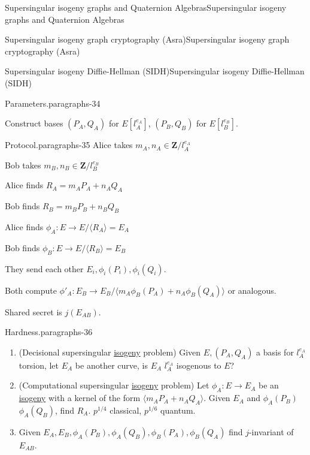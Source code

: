 \documentclass[10pt,]{book}
\numberwithin{equation}{section}
\newcommand{\lb}{[}
\newcommand{\rb}{]}
\newcommand{\ZZ}{\mathbf{Z}}
\begin{document}
\begin{chapterptx}{Supersingular isogeny graphs and Quaternion Algebras}{}{Supersingular isogeny graphs and Quaternion Algebras}{}{}
\begin{sectionptx}{Supersingular isogeny graph cryptography (Asra)}{}{Supersingular isogeny graph cryptography (Asra)}{}{}
\begin{subsectionptx}{Supersingular isogeny Diffie-Hellman (SIDH)}{}{Supersingular isogeny Diffie-Hellman (SIDH)}{}{}
\begin{paragraphs}{Parameters.}{paragraphs-34}
\par
\hypertarget{p-842}{}%
Construct bases \((P_A, Q_A)\) for \(E\lb l_A^{e_A}\rb\), \((P_B, Q_B)\) for \(E\lb l_B^{e_B}\rb\).%
\end{paragraphs}%
\begin{paragraphs}{Protocol.}{paragraphs-35}%
\hypertarget{p-843}{}%
Alice takes \(m_A,n_A \in \ZZ/l_A^{e_A}\)%
\par
\hypertarget{p-844}{}%
Bob takes \(m_B,n_B \in \ZZ/l_B^{e_B}\)%
\par
\hypertarget{p-845}{}%
Alice finds \(R_A = m_AP_A + n_AQ_A\)%
\par
\hypertarget{p-846}{}%
Bob finds \(R_B = m_BP_B + n_BQ_B\)%
\par
\hypertarget{p-847}{}%
Alice finds \(\phi_A \colon E \to E/\langle R_A\rangle = E_A\)%
\par
\hypertarget{p-848}{}%
Bob finds \(\phi_B \colon E \to E/\langle R_B\rangle = E_B\)%
\par
\hypertarget{p-849}{}%
They send each other \(E_i, \phi_i(P_i),\phi_i(Q_i)\).%
\par
\hypertarget{p-850}{}%
Both compute \(\phi'_A\colon E_B \to E_B/\langle m_A\phi_B(P_A) + n_A\phi_B(Q_A)\rangle\) or analogous.%
\par
\hypertarget{p-851}{}%
Shared secret is \(j(E_{AB})\).%
\end{paragraphs}%
\begin{paragraphs}{Hardness.}{paragraphs-36}%
\hypertarget{p-852}{}%
\leavevmode%
\begin{enumerate}
\item\hypertarget{li-212}{}(Decisional supersingular \hyperref[def-supersing-isog-isog]{isogeny} problem) Given \(E, (P_A,Q_A)\) a basis for \(l_A^{e_A}\) torsion, let \(E_A\) be another curve, is \(E_A\) \(l_A^{e_A}\) isogenous to \(E\)?%
\item\hypertarget{li-213}{}(Computational supersingular \hyperref[def-supersing-isog-isog]{isogeny} problem) Let \(\phi_A \colon E \to E_A\) be an \hyperref[def-supersing-isog-isog]{isogeny} with a kernel of the form \(\langle m_AP_A + n_AQ_A \rangle\). Given \(E_A\) and \(\phi_A(P_B)\) \(\phi_A(Q_B)\), find \(R_A\). \(p^{1/4}\) classical, \(p^{1/6}\) quantum.%
\item\hypertarget{li-214}{}Given \(E_A, E_B, \phi_A(P_B), \phi_A(Q_B), \phi_B(P_A), \phi_B(Q_A)\) find \(j\)-invariant of \(E_{AB}\).%
\end{enumerate}
%
\end{paragraphs}%
\end{subsectionptx}

\end{sectionptx}
\end{chapterptx}
\end{document}
